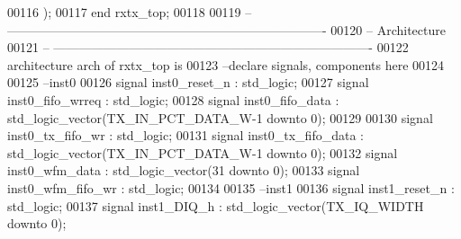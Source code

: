 \begin{DoxyCode}
00116       \textcolor{vhdlchar}{)};
00117 \textcolor{keywordflow}{end} \textcolor{vhdlchar}{rxtx\_top};
00118 
00119 \textcolor{keyword}{-- ----------------------------------------------------------------------------}
00120 \textcolor{keyword}{-- Architecture}
00121 \textcolor{keyword}{-- ----------------------------------------------------------------------------}
00122 \textcolor{keywordflow}{architecture} arch \textcolor{keywordflow}{of} rxtx_top is
00123 \textcolor{keyword}{--declare signals,  components here}
00124      
00125 \textcolor{keyword}{--inst0}
00126 \textcolor{keywordflow}{signal} \textcolor{vhdlchar}{inst0_reset_n}             \textcolor{vhdlchar}{:} \textcolor{comment}{std\_logic};
00127 \textcolor{keywordflow}{signal} \textcolor{vhdlchar}{inst0_fifo_wrreq}          \textcolor{vhdlchar}{:} \textcolor{comment}{std\_logic};
00128 \textcolor{keywordflow}{signal} \textcolor{vhdlchar}{inst0_fifo_data}           \textcolor{vhdlchar}{:} \textcolor{comment}{std\_logic\_vector}\textcolor{vhdlchar}{(}\textcolor{vhdlchar}{TX_IN_PCT_DATA_W}\textcolor{vhdlchar}{-}\textcolor{vhdllogic}{}\textcolor{vhdllogic}{1} \textcolor{keywordflow}{downto} \textcolor{vhdllogic}{}\textcolor{vhdllogic}{0}\textcolor{vhdlchar}{)};
00129 
00130 \textcolor{keywordflow}{signal} \textcolor{vhdlchar}{inst0_tx_fifo_wr}          \textcolor{vhdlchar}{:} \textcolor{comment}{std\_logic};
00131 \textcolor{keywordflow}{signal} \textcolor{vhdlchar}{inst0_tx_fifo_data}        \textcolor{vhdlchar}{:} \textcolor{comment}{std\_logic\_vector}\textcolor{vhdlchar}{(}\textcolor{vhdlchar}{TX_IN_PCT_DATA_W}\textcolor{vhdlchar}{-}\textcolor{vhdllogic}{}\textcolor{vhdllogic}{1} \textcolor{keywordflow}{downto} \textcolor{vhdllogic}{}\textcolor{vhdllogic}{0}\textcolor{vhdlchar}{)};
00132 \textcolor{keywordflow}{signal} \textcolor{vhdlchar}{inst0_wfm_data}            \textcolor{vhdlchar}{:} \textcolor{comment}{std\_logic\_vector}\textcolor{vhdlchar}{(}\textcolor{vhdllogic}{}\textcolor{vhdllogic}{31} \textcolor{keywordflow}{downto} \textcolor{vhdllogic}{}\textcolor{vhdllogic}{0}\textcolor{vhdlchar}{)};
00133 \textcolor{keywordflow}{signal} \textcolor{vhdlchar}{inst0_wfm_fifo_wr}         \textcolor{vhdlchar}{:} \textcolor{comment}{std\_logic};
00134 
00135 \textcolor{keyword}{--inst1}
00136 \textcolor{keywordflow}{signal} \textcolor{vhdlchar}{inst1_reset_n}             \textcolor{vhdlchar}{:} \textcolor{comment}{std\_logic};
00137 \textcolor{keywordflow}{signal} \textcolor{vhdlchar}{inst1_DIQ_h}               \textcolor{vhdlchar}{:} \textcolor{comment}{std\_logic\_vector}\textcolor{vhdlchar}{(}\textcolor{vhdlchar}{TX_IQ_WIDTH} \textcolor{keywordflow}{downto} \textcolor{vhdllogic}{}\textcolor{vhdllogic}{0}\textcolor{vhdlchar}{)};

\end{DoxyCode}
